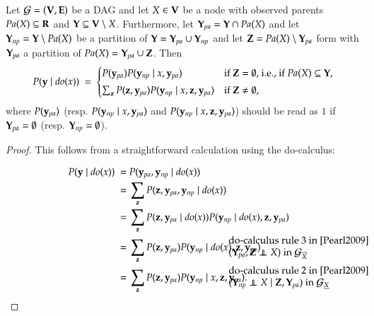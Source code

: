 \begin{proposition}\label{prop:singleton}
Let ${\cal G}=({\bf V},{\bf E})$ be a DAG and let $X \in {\bf V}$ be a node with observed parents 
$ \textit{Pa}(X) \subseteq {\bf R} $ and ${\bf Y}\subseteq {\bf V} \setminus X$.
Furthermore, let ${\bf Y}_{pa} = {\bf Y} \cap \textit{Pa}(X)$ and let ${\bf Y}_{np} = {\bf Y} \setminus \textit{Pa}(X)$  
be a partition of $ {\bf Y} = {\bf Y}_{pa} \cup {\bf Y}_{np} $ and let 
$ {\bf Z} = \textit{Pa}(X) \setminus {\bf Y}_{pa} $ form with $ {\bf Y}_{pa} $ a partition of $ \textit{Pa}(X) = {\bf Y}_{pa} \cup {\bf Z} $.
Then 
\[
  P(\by \mid \textit{do}(x)) \ =\ 
  \begin{cases}
    P(\by_{pa}) P(\by_{np} \mid x, \by_{pa}) & \text{if $\bZ=\emptyset$, i.e., if  $\textit{Pa}(X)\subseteq \bY$,}  \\[1mm]
    \sum_{\bz} P(\bz, \by_{pa}) P(\by_{np} \mid x, \bz, \by_{pa}) & \text{if $\bZ\not=\emptyset$,}  
  \end{cases}
\]
where $P({\bf y}_{pa})$ (resp. $ P({\bf y}_{np} \mid x, {\bf y}_{pa})$  
and $ P({\bf y}_{np} \mid x, {\bf z}, {\bf y}_{pa})$) should be read as $1$ if
${\bf Y}_{pa}=\emptyset$ (resp.  ${\bf Y}_{np}=\emptyset$).
\end{proposition}
\begin{proof}
This follows from a straightforward calculation using the do-calculus:

\begin{align*}
P(\by \mid \textit{do}(x)) \ =\ & P(\by_{pa}, \by_{np} \mid \textit{do}(x))\\
=\ & \sum_{\bz} P(\bz, \by_{pa}, \by_{np} \mid \textit{do}(x))\\
%
=\ & \sum_{\bz} P(\bz, \by_{pa}\mid \textit{do}(x)) P(\by_{np} \mid \textit{do}(x), \bz, \by_{pa}) \\
=\ & \sum_{\bz} P(\bz, \by_{pa}) P(\by_{np} \mid \textit{do}(x), \bz, \by_{pa}) &\rlap{\hspace*{-2.5cm}\parbox{5.5cm}{do-calculus rule 3  in \cite[Subsect. 3.4.2]{Pearl2009}\\$(\bY_{pa}, \bZ \independent X )\text{ in }\cG_{\overline{X}}$}} \\  
=\ & \sum_{\bz} P(\bz, \by_{pa}) P(\by_{np} \mid x, \bz, \by_{pa}).     &\rlap{\hspace*{-2.5cm}\parbox{5.5cm}{do-calculus rule 2 in \cite[Subsect. 3.4.2]{Pearl2009}\\$(\bY_{np} \independent X \mid \bZ, \bY_{pa})\text{ in } \cG_{\underline{X}}$}} \\  
\end{align*}
\end{proof}


